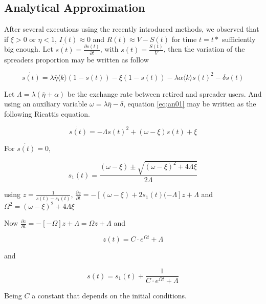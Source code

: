 \subsection{Analytical Approximation}
\label{sec:actual_work}

After several executions using the recently introduced methods, we observed that if $\xi>0$ or $\eta<1$, $I(t)\approx 0$ and $R(t)\approx V-S(t)$ for time $t=t*$ sufficiently big enough. Let $\dot{s(t)}=\frac{\partial s(t)}{\partial t}$, with $s(t)=\frac{S(t)}{V}$, then the variation of the spreaders proportion may be written as follow

\begin{equation}
\label{eq:an01}
\dot{s(t)}=\lambda\overline{\eta}\langle k\rangle (1-s(t))-\xi (1-s(t))-\lambda\alpha\langle k\rangle s(t)^2-\delta s(t)
\end{equation}

Let $\Lambda=\lambda(\overline{\eta}+\alpha)$ be the exchange rate between retired and spreader users. And using an auxiliary variable $\omega=\lambda\overline{\eta}-\delta$, equation \ref{eq:an01} may be written as the following Ricattis equation.

\begin{equation}
\label{eq:an02}
\dot{s(t)}=-\Lambda s(t)^2 +(\omega-\xi)s(t) +\xi
\end{equation}

For $\dot{s(t)}=0$,

\begin{equation}
\label{eq:an03}
s_1(t)=\frac{(\omega-\xi)\pm\sqrt{(\omega-\xi)^2+4\Lambda\xi}}{2\Lambda}
\end{equation}

using $z=\frac{1}{s(t)-s_1(t)}$, $\frac{\partial z}{\partial t}=-[(\omega-\xi)+2s_1(t)(-\Lambda]z+\Lambda$ and $\Omega^2=(\omega-\xi)^2+4\Lambda\xi$

Now $\frac{\partial z}{\partial t}=-[-\Omega]z+\Lambda=\Omega z+\Lambda$ and 

\begin{equation}
\label{eq:an04}
z(t)=C\cdot e^{\Omega t}+\Lambda
\end{equation}

and

\begin{equation}
\label{eq:an04}
s(t)=s_1(t)+\frac{1}{C\cdot e^{\Omega t}+\Lambda}
\end{equation}

Being $C$ a constant that depends on the initial conditions.

